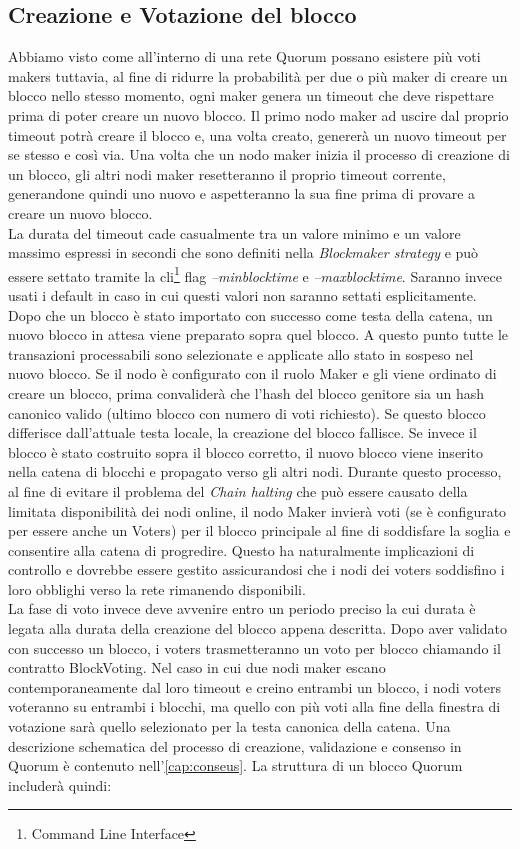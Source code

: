 \subsection{Creazione e Votazione del blocco}%
Abbiamo visto come all'interno di una rete Quorum possano esistere più voti makers tuttavia, al fine di ridurre la probabilità per due o più maker di creare un blocco nello stesso momento, ogni maker genera un timeout che deve rispettare prima di poter creare un nuovo blocco. Il primo nodo maker ad uscire dal proprio timeout potrà creare il blocco e, una volta creato, genererà un nuovo timeout per se stesso e così via. Una volta che un nodo maker inizia il processo di creazione di un blocco, gli altri nodi maker resetteranno il proprio timeout corrente, generandone quindi uno nuovo e aspetteranno la sua fine prima di provare a creare un nuovo blocco. \\
La durata del timeout cade casualmente tra un valore minimo e un valore massimo espressi in secondi che sono definiti nella \emph{Blockmaker strategy} e può essere settato tramite la cli\footnote{Command Line Interface} flag \emph{--minblocktime} e \emph{--maxblocktime}. Saranno invece usati i default in caso in cui questi valori non saranno settati esplicitamente. \\
Dopo che un blocco è stato importato con successo come testa della catena, un nuovo blocco in attesa viene preparato sopra quel blocco. A questo punto tutte le transazioni processabili sono selezionate e applicate allo stato in sospeso nel nuovo blocco. Se il nodo è configurato con il ruolo Maker e gli viene ordinato di creare un blocco, prima convaliderà che l'hash del blocco genitore sia un hash canonico valido (ultimo blocco con numero di voti richiesto). Se questo blocco differisce dall'attuale testa locale, la creazione del blocco fallisce. Se invece il blocco è stato costruito sopra il blocco corretto, il nuovo blocco viene inserito nella catena di blocchi e propagato verso gli altri nodi. Durante questo processo, al fine di evitare il problema del \emph{Chain halting} che può essere causato della limitata disponibilità dei nodi online, il nodo Maker invierà voti (se è configurato per essere anche un Voters) per il blocco principale al fine di soddisfare la soglia e consentire alla catena di progredire. Questo ha naturalmente implicazioni di controllo e dovrebbe essere gestito assicurandosi che i nodi dei voters soddisfino i loro obblighi verso la rete rimanendo disponibili.\\
La fase di voto invece deve avvenire entro un periodo preciso la cui durata è legata alla durata della creazione del blocco appena descritta. Dopo aver validato con successo un blocco, i voters trasmetteranno un voto per blocco chiamando il contratto BlockVoting. Nel caso in cui due nodi maker escano contemporaneamente dal loro timeout e creino entrambi un blocco, i nodi voters voteranno su entrambi i blocchi, ma quello con più voti alla fine della finestra di votazione sarà quello selezionato per la testa canonica della catena. Una descrizione schematica del processo di creazione, validazione e consenso in Quorum è contenuto nell'\autoref{cap:conseus}. La struttura di un blocco Quorum includerà quindi:
